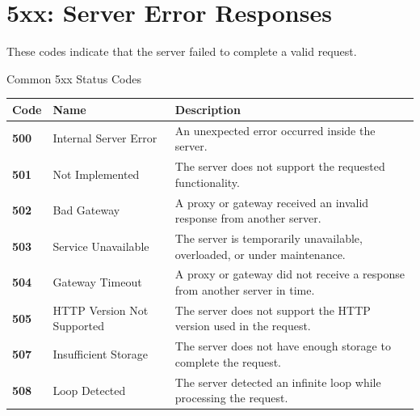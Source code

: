 \documentclass[a4paper]{article}
\begin{document}
    
    \section{5xx: Server Error Responses}
        
        These codes indicate that the server failed to complete a valid request.
        
        \begin{statuscategory}{Common 5xx Status Codes}
            \begin{longtable}{
                    >{\ttfamily\bfseries}p{1.5cm}
                p{4cm}
                p{8cm}
            }
                \toprule
                \textnormal{\textbf{Code}} &
                \textbf{Name} &
                \textbf{Description} \\
                \midrule
                500 &
                Internal Server Error &
                An unexpected error occurred inside the server. \\
                
                501 &
                Not Implemented &
                The server does not support the requested functionality. \\
                
                502 &
                Bad Gateway &
                A proxy or gateway received an invalid response from another server. \\
                
                503 &
                Service Unavailable &
                The server is temporarily unavailable, overloaded, or under maintenance. \\
                
                504 &
                Gateway Timeout &
                A proxy or gateway did not receive a response from another server in time. \\
                
                505 &
                HTTP Version Not Supported &
                The server does not support the HTTP version used in the request. \\
                
                507 &
                Insufficient Storage &
                The server does not have enough storage to complete the request. \\
                
                508 &
                Loop Detected &
                The server detected an infinite loop while processing the request. \\
                \bottomrule
            \end{longtable}
        \end{statuscategory}
        
\end{document}

